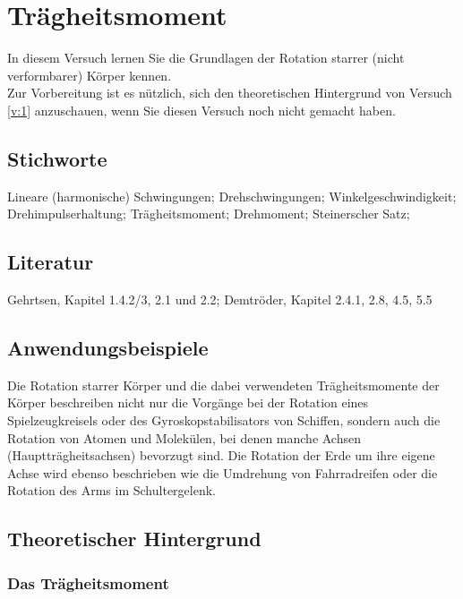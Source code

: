 \chapter{Trägheitsmoment}
\label{v:2}

In diesem Versuch lernen Sie die Grundlagen der Rotation starrer (nicht verformbarer) Körper kennen.\\
Zur Vorbereitung ist es nützlich, sich den theoretischen Hintergrund von Versuch \ref{v:1} anzuschauen, wenn Sie diesen Versuch noch nicht gemacht haben.

\section{Stichworte}
Lineare (harmonische) Schwingungen; Drehschwingungen; Winkelgeschwindigkeit; Drehimpulserhaltung; Trägheitsmoment; Drehmoment; Steinerscher Satz; 
%
\section{Literatur}
Gehrtsen, Kapitel 1.4.2/3, 2.1 und 2.2; Demtröder, Kapitel 2.4.1, 2.8, 4.5, 5.5
%
\section{Anwendungsbeispiele}
%
Die Rotation starrer Körper und die dabei verwendeten Trägheitsmomente der Körper beschreiben nicht nur die Vorgänge bei der Rotation eines Spielzeugkreisels oder des Gyroskopstabilisators von Schiffen, sondern auch die Rotation von Atomen und Molekülen, bei denen manche Achsen (Hauptträgheitsachsen) bevorzugt sind. Die Rotation der Erde um ihre eigene Achse wird ebenso beschrieben wie die Umdrehung von Fahrradreifen oder die Rotation des Arms im Schultergelenk.
%
\section{Theoretischer Hintergrund}

\subsection{Das Trägheitsmoment}


